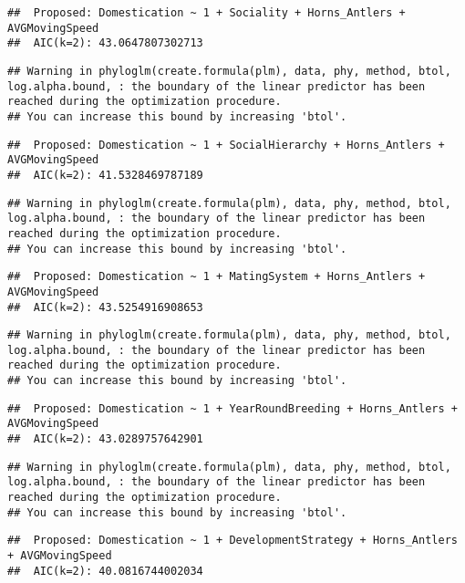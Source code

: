 \documentclass[
]{article}
\begin{document}
\begin{verbatim}
##  Proposed: Domestication ~ 1 + Sociality + Horns_Antlers + AVGMovingSpeed
##  AIC(k=2): 43.0647807302713
\end{verbatim}

\begin{verbatim}
## Warning in phyloglm(create.formula(plm), data, phy, method, btol, log.alpha.bound, : the boundary of the linear predictor has been reached during the optimization procedure.
## You can increase this bound by increasing 'btol'.
\end{verbatim}

\begin{verbatim}
##  Proposed: Domestication ~ 1 + SocialHierarchy + Horns_Antlers + AVGMovingSpeed
##  AIC(k=2): 41.5328469787189
\end{verbatim}

\begin{verbatim}
## Warning in phyloglm(create.formula(plm), data, phy, method, btol, log.alpha.bound, : the boundary of the linear predictor has been reached during the optimization procedure.
## You can increase this bound by increasing 'btol'.
\end{verbatim}

\begin{verbatim}
##  Proposed: Domestication ~ 1 + MatingSystem + Horns_Antlers + AVGMovingSpeed
##  AIC(k=2): 43.5254916908653
\end{verbatim}

\begin{verbatim}
## Warning in phyloglm(create.formula(plm), data, phy, method, btol, log.alpha.bound, : the boundary of the linear predictor has been reached during the optimization procedure.
## You can increase this bound by increasing 'btol'.
\end{verbatim}

\begin{verbatim}
##  Proposed: Domestication ~ 1 + YearRoundBreeding + Horns_Antlers + AVGMovingSpeed
##  AIC(k=2): 43.0289757642901
\end{verbatim}

\begin{verbatim}
## Warning in phyloglm(create.formula(plm), data, phy, method, btol, log.alpha.bound, : the boundary of the linear predictor has been reached during the optimization procedure.
## You can increase this bound by increasing 'btol'.
\end{verbatim}

\begin{verbatim}
##  Proposed: Domestication ~ 1 + DevelopmentStrategy + Horns_Antlers + AVGMovingSpeed
##  AIC(k=2): 40.0816744002034
\end{verbatim}
\end{document}
